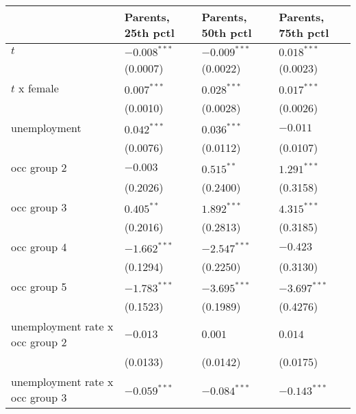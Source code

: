 \begin{tabular}{llll}
\toprule
{} & Parents, 25th pctl & Parents, 50th pctl & Parents, 75th pctl \\
\midrule
$t$                                      &     $-0.008^{***}$ &     $-0.009^{***}$ &      $0.018^{***}$ \\
                                         &           (0.0007) &           (0.0022) &           (0.0023) \\
$t$ x female                             &      $0.007^{***}$ &      $0.028^{***}$ &      $0.017^{***}$ \\
                                         &           (0.0010) &           (0.0028) &           (0.0026) \\
unemployment                             &      $0.042^{***}$ &      $0.036^{***}$ &           $-0.011$ \\
                                         &           (0.0076) &           (0.0112) &           (0.0107) \\
occ group 2                              &           $-0.003$ &       $0.515^{**}$ &      $1.291^{***}$ \\
                                         &           (0.2026) &           (0.2400) &           (0.3158) \\
occ group 3                              &       $0.405^{**}$ &      $1.892^{***}$ &      $4.315^{***}$ \\
                                         &           (0.2016) &           (0.2813) &           (0.3185) \\
occ group 4                              &     $-1.662^{***}$ &     $-2.547^{***}$ &           $-0.423$ \\
                                         &           (0.1294) &           (0.2250) &           (0.3130) \\
occ group 5                              &     $-1.783^{***}$ &     $-3.695^{***}$ &     $-3.697^{***}$ \\
                                         &           (0.1523) &           (0.1989) &           (0.4276) \\
unemployment rate x occ group 2          &           $-0.013$ &            $0.001$ &            $0.014$ \\
                                         &           (0.0133) &           (0.0142) &           (0.0175) \\
unemployment rate x occ group 3          &     $-0.059^{***}$ &     $-0.084^{***}$ &     $-0.143^{***}$ \\

\end{tabular}
